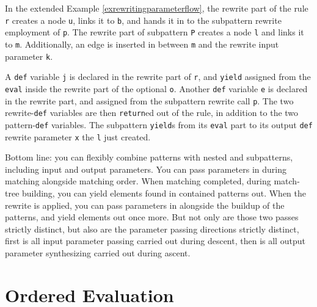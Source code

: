 In the extended Example \ref{exrewritingparameterflow}, the rewrite part of the rule \texttt{r} creates a node \texttt{u}, links it to \texttt{b}, and hands it in to the subpattern rewrite employment of \texttt{p}.
The rewrite part of subpattern \texttt{P} creates a node \texttt{l} and links it to \texttt{m}.
Additionally, an edge is inserted in between \texttt{m} and the rewrite input parameter \texttt{k}.

A \texttt{def} variable \texttt{j} is declared in the rewrite part of \texttt{r}, and \texttt{yield} assigned from the \texttt{eval} inside the rewrite part of the optional \texttt{o}.
Another \texttt{def} variable \texttt{e} is declared in the rewrite part, and assigned from the subpattern rewrite call \texttt{p}.
The two rewrite-\texttt{def} variables are then \texttt{return}ed out of the rule, in addition to the two pattern-\texttt{def} variables.
The subpattern \texttt{yield}s from its \texttt{eval} part to its output \texttt{def} rewrite parameter \texttt{x} the \texttt{l} just created.

Bottom line: you can flexibly combine patterns with nested and subpatterns, including input and output parameters.
You can pass parameters in during matching alongside matching order. When matching completed, during match-tree building, you can yield elements found in contained patterns out. 
When the rewrite is applied, you can pass parameters in alongside the buildup of the patterns, and yield elements out once more.
But not only are those two passes strictly distinct, but also are the parameter passing directions strictly distinct, first is all input parameter passing carried out during descent, then is all output parameter synthesizing carried out during ascent.


\section{Ordered Evaluation} \label{sec:localvarorderedevalyield}

